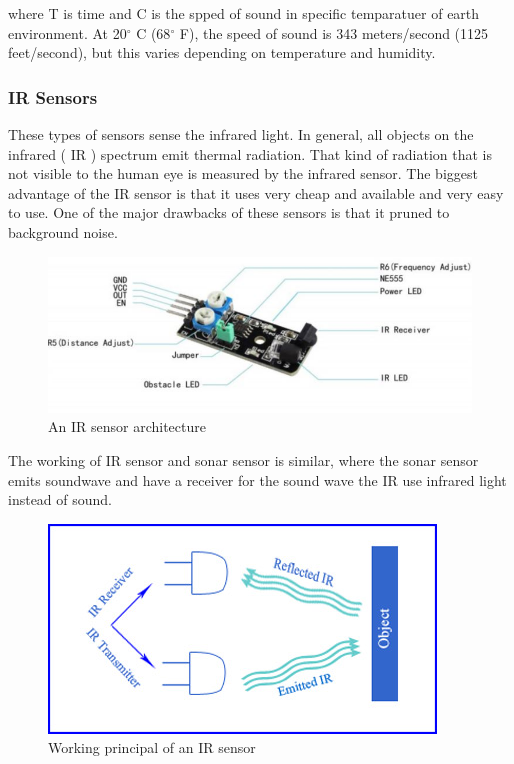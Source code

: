 where T is time and C is the spped of sound in specific temparatuer of earth environment. At 20$^{\circ}$ C (68$^{\circ}$ F), the speed of sound is 343 meters/second (1125 feet/second), but this varies depending on temperature and humidity.


\subsubsection{IR Sensors}

These types of sensors sense the infrared light. In general, all objects on the infrared ( IR ) spectrum emit thermal radiation. That kind of radiation that is not visible to the human eye is measured by the infrared sensor. The biggest advantage of the IR sensor is that it uses very cheap and available and very easy to use. One of the major drawbacks of these sensors is that it pruned to background noise.

\begin{figure}[h]
  \centering
    \includegraphics[width=\linewidth]{figures/irSensor.jpg}
    \caption{An IR sensor architecture}
\label{fig:irSensor}
\end{figure}


The working of IR sensor and sonar sensor is similar, where the sonar sensor emits soundwave and have a receiver for the sound wave the IR use infrared light instead of sound. 

\begin{figure}[h]
  \centering
    \includegraphics[width=0.5\linewidth]{figures/irSensorWork.jpg}
    \caption{Working principal of an IR sensor}
\label{fig:irSensorWork }
\end{figure}


